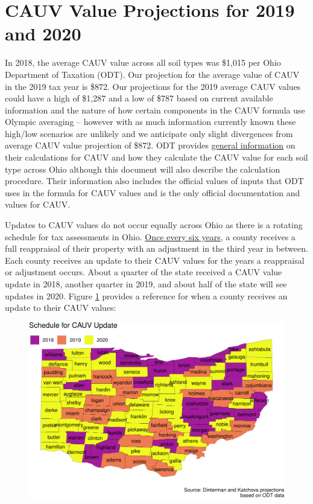 \documentclass[]{article}
\begin{document}
\newpage
{}

\hypertarget{cauv-value-projections-for-2019-and-2020}{%
\section{CAUV Value Projections for 2019 and
2020}\label{cauv-value-projections-for-2019-and-2020}}

In 2018, the average CAUV value across all soil types was \$1,015 per
Ohio Department of Taxation (ODT). Our projection for the average value
of CAUV in the 2019 tax year is \$872. Our projections for the 2019
average CAUV values could have a high of \$1,287 and a low of \$787
based on current available information and the nature of how certain
components in the CAUV formula use Olympic averaging -- however with as
much information currently known these high/low scenarios are unlikely
and we anticipate only slight divergences from average CAUV value
projection of \$872. ODT provides
\href{https://www.tax.ohio.gov/real_property/cauv.aspx}{general
information} on their calculations for CAUV and how they calculate the
CAUV value for each soil type across Ohio although this document will
also describe the calculation procedure. Their information also includes
the official values of inputs that ODT uses in the formula for CAUV
values and is the only official documentation and values for CAUV.

Updates to CAUV values do not occur equally across Ohio as there is a
rotating schedule for tax assessments in Ohio.
\href{https://www.tax.ohio.gov/real_estate/reappraisal_and_triennial_update.aspx}{Once
every six years}, a county receives a full reappraisal of their property
with an adjustment in the third year in between. Each county receives an
update to their CAUV values for the years a reappraisal or adjustment
occurs. About a quarter of the state received a CAUV value update in
2018, another quarter in 2019, and about half of the state will see
updates in 2020. Figure \ref{fig:update-map} provides a reference for
when a county receives an update to their CAUV values:

\begin{figure}[H]
\includegraphics[width=1\linewidth]{4-projections-2019-2020_files/figure-latex/update-map-1} \caption{\label{fig:update-map}}\label{fig:update-map}
\end{figure}
\end{document}
